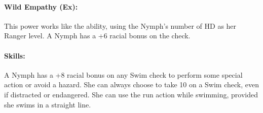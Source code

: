\paragraph{Wild Empathy (Ex):}
This power works like the  ability, using the Nymph's number of HD as her Ranger level. A Nymph has a +6 racial bonus on the check.

\paragraph{Skills:}
A Nymph has a +8 racial bonus on any Swim check to perform some special action or avoid a hazard. She can always choose to take 10 on a Swim check, even if distracted or endangered. She can use the run action while swimming, provided she swims in a straight line.